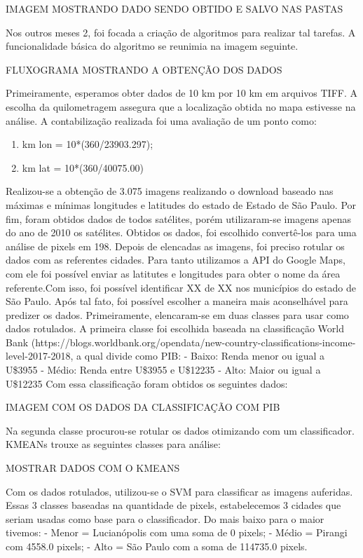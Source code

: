 \documentclass[]{article}
\begin{document}
IMAGEM MOSTRANDO DADO SENDO OBTIDO E SALVO NAS PASTAS

Nos outros meses 2, foi focada a criação de algoritmos para realizar tal tarefas. A funcionalidade básica do algoritmo se reunimia na imagem seguinte. 

FLUXOGRAMA MOSTRANDO A OBTENÇÃO DOS DADOS

Primeiramente, esperamos obter dados de 10 km por 10 km em arquivos TIFF. A escolha da quilometragem assegura que a localização obtida no mapa estivesse na análise. A contabilização realizada foi uma avaliação de um ponto como:
\begin{enumerate}
	
	\item km lon = 10*(360/23903.297);
	
	\item km lat = 10*(360/40075.00)
	
\end{enumerate}

Realizou-se a obtenção de 3.075 imagens realizando o download baseado nas máximas e mínimas longitudes e latitudes do estado de Estado de São Paulo. Por fim, foram obtidos dados de todos satélites, porém utilizaram-se imagens apenas do ano de 2010 os satélites. Obtidos os dados, foi escolhido convertê-los para uma análise de pixels em 198.
Depois de elencadas as imagens, foi preciso rotular os dados com as referentes cidades. Para tanto utilizamos a API do Google Maps, com ele foi possível enviar as latitutes e longitudes para obter o nome da área referente.Com isso, foi possível identificar XX de XX nos municípios do estado de São Paulo.
Após tal fato, foi possível escolher a maneira mais aconselhável para predizer os dados. Primeiramente, elencaram-se em duas classes para usar como dados rotulados. A primeira classe foi escolhida baseada na classificação World Bank (https://blogs.worldbank.org/opendata/new-country-classifications-income-level-2017-2018, a qual divide como PIB:
- Baixo: Renda menor ou igual a U\$3955
- Médio: Renda entre U\$3955 e U\$12235
- Alto: Maior ou igual a U\$12235
Com essa classificação foram obtidos os seguintes dados:

IMAGEM COM OS DADOS DA CLASSIFICAÇÃO COM PIB

Na segunda classe procurou-se rotular os dados otimizando com um classificador. KMEANs trouxe as seguintes classes para análise:

MOSTRAR DADOS COM O KMEANS

Com os dados rotulados, utilizou-se o SVM para classificar as imagens auferidas. Essas 3 classes baseadas na quantidade de pixels, estabelecemos 3 cidades que seriam usadas como base para o classificador. Do mais baixo para o maior tivemos:
- Menor = Lucianópolis com uma soma de 0 pixels;
- Médio = Pirangi com 4558.0 pixels;
- Alto = São Paulo com a soma de 114735.0 pixels.
\end{document}
